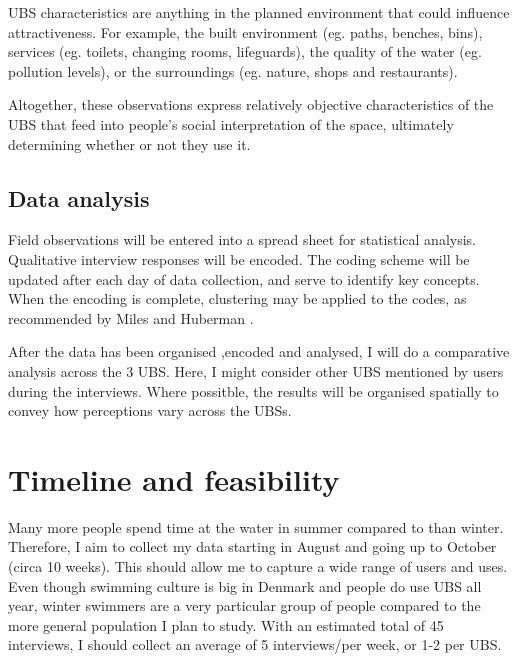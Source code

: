 \documentclass{article}
\begin{document}
UBS characteristics are anything in the planned environment that could influence attractiveness.
For example, the built environment (eg. paths, benches, bins), services (eg. toilets, changing rooms, lifeguards), the quality of the water (eg. pollution levels), or the surroundings (eg. nature, shops and restaurants).

Altogether, these observations express relatively objective characteristics of the UBS that feed into people's social interpretation of the space, ultimately determining whether or not they use it.

\subsection{Data analysis}

Field observations will be entered into a spread sheet for statistical analysis.
Qualitative interview responses will be encoded. The coding scheme will be updated after each day of data collection, and serve to identify key concepts. When the encoding is complete, clustering may be applied to the codes, as recommended by Miles and Huberman \parencite{miles1994qualitative}.

After the data has been organised ,encoded and analysed, I will do a comparative analysis across the 3 UBS. Here, I might consider other UBS mentioned by users during the interviews.
Where possitble, the results will be organised spatially to convey how perceptions vary across the UBSs.


\section{Timeline and feasibility}

Many more people spend time at the water in summer compared to than winter. Therefore, I aim to collect my data starting in August and going up to October (circa 10 weeks). This should allow me to capture a wide range of users and uses. Even though swimming culture is big in Denmark and people do use UBS all year, winter swimmers are a very particular group of people compared to the more general population I plan to study.
With an estimated total of 45 interviews, I should collect an average of 5 interviews/per week, or 1-2 per UBS.
\end{document}
